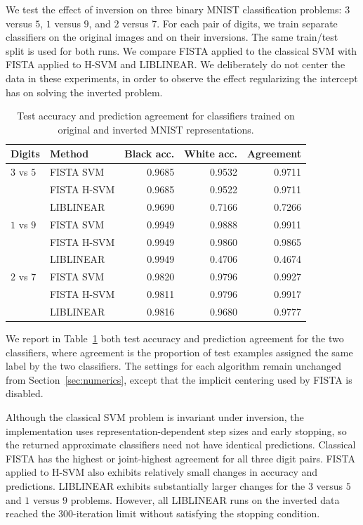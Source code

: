 \documentclass[twoside,11pt]{article}
\begin{document}
We test the effect of inversion on three binary MNIST classification problems: $3$ versus $5$, $1$ versus $9$, and $2$ versus $7$. For each pair of digits, we train separate classifiers on the original images and on their inversions. The same train/test split is used for both runs. We compare FISTA applied to the classical SVM with FISTA applied to H-SVM and LIBLINEAR. We deliberately do not center the data in these experiments, in order to observe the effect regularizing the intercept has on solving the inverted problem.

\begin{table}[t]
\caption{Test accuracy and prediction agreement for classifiers trained on
original and inverted MNIST representations.}
\label{tab:mnist-inversion}
\centering
\footnotesize
\setlength{\tabcolsep}{4pt}
\renewcommand{\arraystretch}{1.1}

\begin{tabular}{llrrr}
\toprule
Digits & Method & Black acc. & White acc. & Agreement\\
\midrule
$3$ vs $5$
& FISTA SVM
& 0.9685 & 0.9532
& 0.9711\\
& FISTA H-SVM
& 0.9685 & 0.9522
& 0.9711\\
& LIBLINEAR
& 0.9690 & 0.7166
& 0.7266\\

\midrule
$1$ vs $9$
& FISTA SVM
& 0.9949 & 0.9888 & 0.9911\\
& FISTA H-SVM
& 0.9949 & 0.9860 & 0.9865\\
& LIBLINEAR
& 0.9949 & 0.4706 & 0.4674\\

\midrule
$2$ vs $7$
& FISTA SVM
& 0.9820 & 0.9796 & 0.9927\\
& FISTA H-SVM
& 0.9811 & 0.9796 & 0.9917\\
& LIBLINEAR
& 0.9816 & 0.9680 & 0.9777\\
\bottomrule
\end{tabular}

\vskip -0.1in
\end{table}

We report in Table~\ref{tab:mnist-inversion} both test accuracy and prediction agreement for the two classifiers, where agreement is the proportion of test examples assigned the same label by the two classifiers. The settings for each algorithm remain unchanged from Section~\ref{sec:numerics}, except that the implicit centering used by FISTA is disabled.

Although the classical SVM problem is invariant under inversion, the implementation uses representation-dependent step sizes and early stopping, so the returned approximate classifiers need not have identical predictions. Classical FISTA has the highest or joint-highest agreement for all three digit pairs. FISTA applied to H-SVM also exhibits relatively small changes in accuracy and predictions. LIBLINEAR exhibits substantially larger changes for the $3$ versus $5$ and $1$ versus $9$ problems. However, all LIBLINEAR runs on the inverted data reached the $300$-iteration limit without satisfying the stopping condition.
\end{document}
